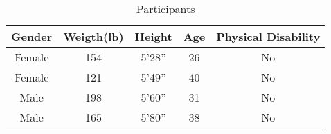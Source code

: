 \documentclass{article}
\begin{document}
\newcommand\mcr[1]{\multicolumn{1}{c|}{#1}}
\newcommand\mcl[1]{\multicolumn{1}{|c|}{#1}}
\begin{table}[!h]
\centering
\begin{tabular}{ccccc}
    Gender  &Weigth(lb)  &Height  & Age  & Physical Disability\\
    \hline
    \mcl{Female} & \mcr{154} &\mcr{5'28''} &\mcr{26} &\mcr{No} \\
    \mcl{Female} & \mcr{121}   &\mcr{5'49''} &\mcr{40} & \mcr{No} \\
    \mcl{Male}   & \mcr{198} &\mcr{5'60''} &\mcr{31}&\mcr{No}\\
    \mcl{Male}   & \mcr{165} &\mcr{5'80''} &\mcr{38}  & \mcr{No}\\
    \hline
\end{tabular}
\label{Tab::Participants}
\caption{Participants}
\end{table} 
\end{document}
